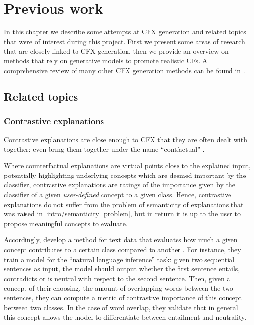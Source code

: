 \documentclass[../main.tex]{subfiles}
\begin{document}
\chapter{Previous work}
\label{ch:previous_work}

In this chapter we describe some attempts at CFX generation and related topics that were of interest during this project.
First we present some areas of research that are closely linked to CFX generation, then we provide an overview on methods that rely on generative models to promote realistic CFs.
A comprehensive review of many other CFX generation methods can be found in \cite{vermaCounterfactual2020}.

\section{Related topics}

\subsection{Contrastive explanations}

Contrastive explanations are close enough to CFX that they are often dealt with together: \citeauthor{stepinSurvey2021} even bring them together under the name ``contfactual'' \cite{stepinSurvey2021}.

Where counterfactual explanations are virtual points close to the explained input, potentially highlighting underlying concepts which are deemed important by the classifier, contrastive explanations are ratings of the importance given by the classifier of a given \emph{user-defined} concept to a given class.
Hence, contrastive explanations do not suffer from the problem of semanticity of explanations that was raised in \autoref{intro/semanticity_problem}, but in return it is up to the user to propose meaningful concepts to evaluate.

Accordingly, \citeauthor{jacoviContrastive2021} develop a method for text data that evaluates how much a given concept contributes to a certain class compared to another \cite{jacoviContrastive2021}.
For instance, they train a model for the ``natural language inference'' task: given two sequential sentences as input, the model should output whether the first sentence entails, contradicts or is neutral with respect to the second sentence.
Then, given a concept of their choosing, \eg{} the amount of overlapping words between the two sentences, they can compute a metric of contrastive importance of this concept between two classes.
In the case of word overlap, they validate that in general this concept allows the model to differentiate between entailment and neutrality.
\end{document}
